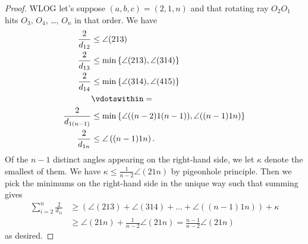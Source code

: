 \begin{proof}
  WLOG let's suppose $(a,b,c) = (2,1,n)$ and
  that rotating ray $O_2 O_1$ hits $O_3$, $O_4$, \dots, $O_n$
  in that order.
  We have
  \begin{align*}
    \frac{2}{d_{12}} &\le \angle(213) \\
    \frac{2}{d_{13}} &\le \min \left\{ \angle(213), \angle(314) \right\} \\
    \frac{2}{d_{14}} &\le \min \left\{ \angle(314), \angle(415) \right\} \\
    &\vdotswithin=  \\
    \frac{2}{d_{1(n-1)}} &\le
      \min \left\{ \angle((n-2)1(n-1)), \angle((n-1)1n) \right\} \\
    \frac{2}{d_{1n}} &\le \angle\left( (n-1) 1 n \right).
  \end{align*}
  Of the $n-1$ distinct angles appearing on the right-hand side,
  we let $\kappa$ denote the smallest of them.
  We have $\kappa \le \frac{1}{n-2} \angle(21n)$
  by pigeonhole principle.
  Then we pick the minimums on the right-hand side in
  the unique way such that summing gives
  \begin{align*}
    \sum_{i=2}^n \frac{2}{d_{1i}}
    &\ge \left( \angle(213)+\angle(314)+\dots+\angle( (n-1)1n ) \right)
      + \kappa \\
    &\ge \angle(21n) + \frac{1}{n-2} \angle(21n) = \frac{n-1}{n-2} \angle(21n)
  \end{align*}
  as desired.
\end{proof}


